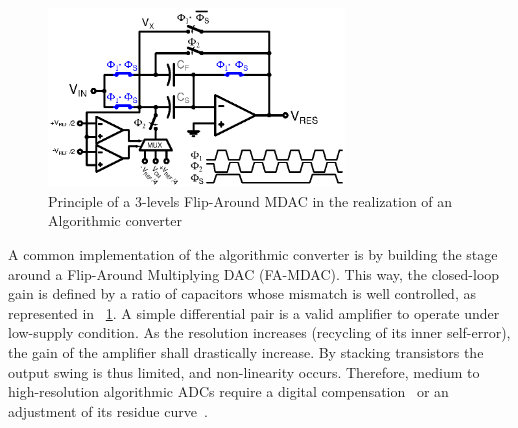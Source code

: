 \begin{figure}[htp]
	\centering
    \includegraphics[width=0.7\textwidth]{Chapter3/Figs/algo_mdac_std.ps}
	\caption{Principle of a 3-levels Flip-Around MDAC in the realization of an Algorithmic converter}
	\label{fig:algo_mdac}
\end{figure}

A common implementation of the algorithmic converter is by building the stage around a Flip-Around Multiplying DAC (FA-MDAC). This way, the closed-loop gain is defined by a ratio of capacitors whose mismatch is well controlled, as represented in \figurename~\ref{fig:algo_mdac}. A simple differential pair is a valid amplifier to operate under low-supply condition. As the resolution increases (recycling of its inner self-error), the gain of the amplifier shall drastically increase. By stacking transistors the output swing is thus limited, and non-linearity occurs. Therefore, medium to high-resolution algorithmic ADCs require a digital compensation~\cite{Murmann2003} or an adjustment of its residue curve~\cite{Inoue2017,Naderi2017}.

